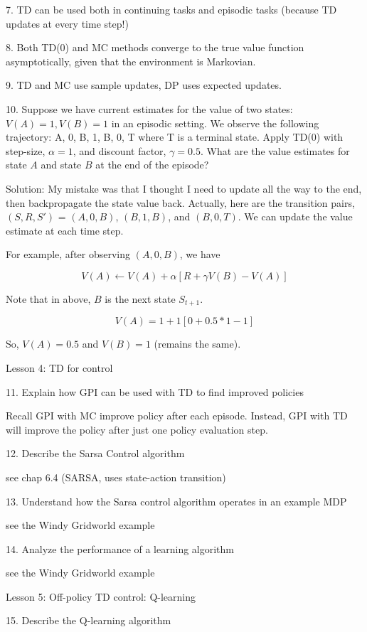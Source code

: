 \documentclass[sutton_barto_notes.tex]{subfiles}
\begin{document}
7. TD can be used both in continuing tasks and episodic tasks (because TD updates at every time step!)

8. Both TD(0) and MC methods converge to the true value function asymptotically, given that the environment is Markovian.

9. TD and MC use sample updates, DP uses expected updates.

10. Suppose we have current estimates for the value of two states: $V(A) = 1, V(B) = 1$ in an episodic setting. We observe the following trajectory: A, 0, B, 1, B, 0, T where T is a terminal state. Apply TD(0) with step-size, $\alpha = 1$, and discount factor, $\gamma = 0.5$. What are the value estimates for state $A$ and state $B$ at the end of the episode?

Solution: My mistake was that I thought I need to update all the way to the end, then backpropagate the state value back.
Actually, here are the transition pairs, $(S, R, S')$ = $(A, 0, B)$, $(B, 1, B)$, and $(B, 0, T)$. We can update the value estimate at each time step.

For example, after observing $(A, 0, B)$, we have

$$V(A) \leftarrow V(A) + \alpha [R + \gamma V(B) - V(A)]$$

Note that in above, $B$ is the next state $S_{t+1}$.

$$V(A) = 1 + 1 [0 + 0.5 * 1 - 1]$$

So, $V(A) = 0.5$ and $V(B) = 1$ (remains the same).

Lesson 4: TD for control

11. Explain how GPI can be used with TD to find improved policies

Recall GPI with MC improve policy after each episode. Instead,
GPI with TD will improve the policy after just one policy evaluation step.

12. Describe the Sarsa Control algorithm

see chap 6.4 (SARSA, uses state-action transition)

13. Understand how the Sarsa control algorithm operates in an example MDP

see the Windy Gridworld example

14. Analyze the performance of a learning algorithm

see the Windy Gridworld example

Lesson 5: Off-policy TD control: Q-learning

15. Describe the Q-learning algorithm
\end{document}
